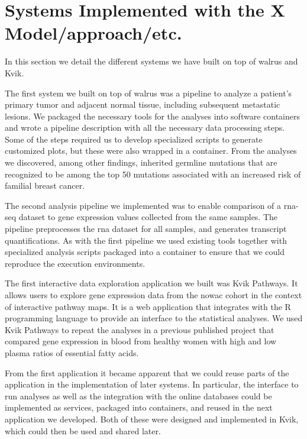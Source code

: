 \section{Systems Implemented with the X Model/approach/etc.} 
In this section we detail the different systems we have built on top of walrus
and Kvik. 

The first system we built on top of walrus was a pipeline to analyze a patient’s
primary tumor and adjacent normal tissue, including subsequent metastatic
lesions.\cite{walrus} We packaged the necessary tools for the analyses into
software containers and wrote a pipeline description with all the necessary data
processing steps. Some of the steps required us to develop specialized scripts
to generate customized plots, but these were also wrapped in a container. From
the analyses we discovered, among other findings, inherited germline mutations
that are recognized to be among the top 50 mutations associated with an
increased risk of familial breast cancer.

The second analysis pipeline we implemented was to enable comparison of a
\gls{rna}-seq dataset to 
gene expression values collected from the same samples.
The pipeline preprocesses the \gls{rna} dataset for all samples, and generates
transcript quantifications. As with the first pipeline we used existing tools
together with specialized analysis scripts packaged into a container to ensure
that we could reproduce the execution environments. 


The first interactive data exploration application we built was Kvik Pathways.
It allows users to explore gene expression data from the \gls{nowac} cohort in
the context of interactive pathway maps.\cite{pathways} It is a web application
that integrates with the R programming language to provide an interface to the
statistical analyses. We used Kvik Pathways to repeat the analyses in a previous
published project that compared gene expression in blood from healthy women with
high and low plasma ratios of essential fatty acids.\cite{olsen2013plasma}

From the first application it became apparent that we could reuse parts of the
application in the implementation of later systems. In particular, the interface
to run analyses as well as the integration with the online databases could be
implemented as services, packaged into containers, and reused in the next
application we developed. Both of these were designed and implemented in Kvik,
which could then be used and shared later. 

